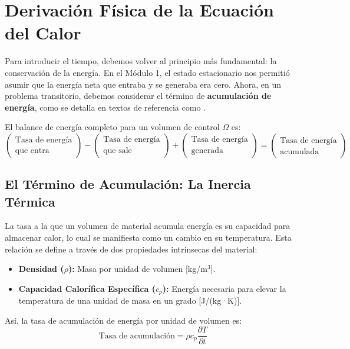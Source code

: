 \section{Derivación Física de la Ecuación del Calor}
Para introducir el tiempo, debemos volver al principio más fundamental: la conservación de la energía. En el Módulo 1, el estado estacionario nos permitió asumir que la energía neta que entraba y se generaba era cero. Ahora, en un problema transitorio, debemos considerar el término de \textbf{acumulación de energía}, como se detalla en textos de referencia como \cite{incropera2007}.

El balance de energía completo para un volumen de control $\Omega$ es:
$$ \left( \begin{array}{c} \text{Tasa de energía} \\ \text{que entra} \end{array} \right) - \left( \begin{array}{c} \text{Tasa de energía} \\ \text{que sale} \end{array} \right) + \left( \begin{array}{c} \text{Tasa de energía} \\ \text{generada} \end{array} \right) = \left( \begin{array}{c} \text{Tasa de energía} \\ \text{acumulada} \end{array} \right) $$

\subsection{El Término de Acumulación: La Inercia Térmica}
La tasa a la que un volumen de material acumula energía es su capacidad para almacenar calor, lo cual se manifiesta como un cambio en su temperatura. Esta relación se define a través de dos propiedades intrínsecas del material:
\begin{itemize}
    \item \textbf{Densidad ($\rho$):} Masa por unidad de volumen [kg/m$^3$].
    \item \textbf{Capacidad Calorífica Específica ($c_p$):} Energía necesaria para elevar la temperatura de una unidad de masa en un grado [J/(kg·K)].
\end{itemize}
Así, la tasa de acumulación de energía por unidad de volumen es:
\begin{equation}
    \text{Tasa de acumulación} = \rho c_p \frac{\partial T}{\partial t}
\end{equation}

